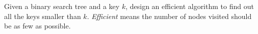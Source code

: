 Given a binary search tree and a key $k$, design an efficient algorithm
to find out all the keys smaller than $k$. {\em Efficient} means the
number of nodes visited should be as few as possible.
